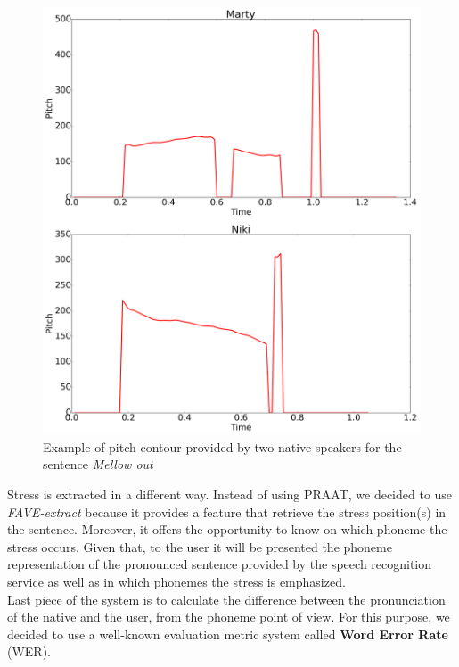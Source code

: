 \begin{figure}[!ht]
	\centering
	\includegraphics[scale=0.15]{Figures/pitch_native.png}
	\caption{Example of pitch contour provided by two native speakers for the sentence \textit{Mellow out}}
	\label{fig:pitch_native}
\end{figure}

\noindent Stress is extracted in a different way. Instead of using PRAAT, we decided to use \textit{FAVE-extract} because it provides a feature that retrieve the stress position(s) in the sentence. Moreover, it offers the opportunity to know on which phoneme the stress occurs. Given that, to the user it will be presented the phoneme representation of the pronounced sentence provided by the speech recognition service as well as in which phonemes the stress is emphasized. \\

\noindent Last piece of the system is to calculate the difference between the pronunciation of the native and the user, from the phoneme point of view. For this purpose, we decided to use a well-known evaluation metric system called \textbf{Word Error Rate} (WER). \\


